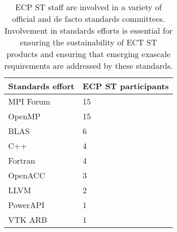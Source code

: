 \begin{table}[h!]
\centering
\begin{tabular}{|l|l|}
\hline
\rowcolor{LightCyan}
\textbf{Standards effort} & \textbf{ECP ST participants} \\ \hline
MPI Forum & 15 \\ \hline
OpenMP & 15 \\ \hline
BLAS & 6 \\ \hline
C++ & 4 \\ \hline
Fortran & 4 \\ \hline
OpenACC & 3 \\ \hline
LLVM & 2 \\ \hline
PowerAPI & 1 \\ \hline
VTK ARB & 1 \\ \hline
\end{tabular}
	\caption{\label{table:standards} ECP ST staff are involved in a variety of official and de facto standards committees.  Involvement in standards efforts is essential for ensuring the sustainability of ECT ST products and ensuring that emerging exascale requirements are addressed by these standards.}
\end{table}
